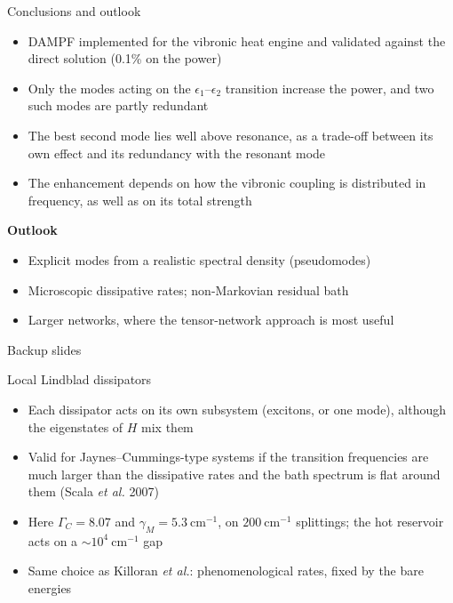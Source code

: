 \documentclass[aspectratio=169,11pt]{beamer}
\begin{document}
\begin{frame}{Conclusions and outlook}
  \begin{itemize}\setlength\itemsep{0.6em}
    \item DAMPF implemented for the vibronic heat engine and validated against the direct solution (0.1\% on the power)
    \item Only the modes acting on the $\epsilon_1$--$\epsilon_2$ transition increase the power, and two such modes are partly redundant
    \item The best second mode lies well above resonance, as a trade-off between its own effect and its redundancy with the resonant mode
    \item The enhancement depends on how the vibronic coupling is distributed in frequency, as well as on its total strength
  \end{itemize}
  \vspace{0.6em}
  {\color{tblue}\textbf{Outlook}}
  \begin{itemize}\setlength\itemsep{0.4em}
    \item Explicit modes from a realistic spectral density (pseudomodes)
    \item Microscopic dissipative rates; non-Markovian residual bath
    \item Larger networks, where the tensor-network approach is most useful
  \end{itemize}
\end{frame}

\appendix
\begin{frame}[plain]
  \centering\vfill{\Large\color{tblue}Backup slides}\vfill
\end{frame}

\begin{frame}{Local Lindblad dissipators}
  \begin{itemize}\setlength\itemsep{0.8em}
    \item Each dissipator acts on its own subsystem (excitons, or one mode), although the eigenstates of $H$ mix them
    \item Valid for Jaynes--Cummings-type systems if the transition frequencies are much larger than the dissipative rates and the bath spectrum is flat around them (Scala \textit{et al.} 2007)
    \item Here $\Gamma_C=8.07$ and $\gamma_M=5.3~\mathrm{cm^{-1}}$, on $200~\mathrm{cm^{-1}}$ splittings; the hot reservoir acts on a $\sim10^4~\mathrm{cm^{-1}}$ gap
    \item Same choice as Killoran \textit{et al.}: phenomenological rates, fixed by the bare energies
  \end{itemize}
\end{frame}
\end{document}
